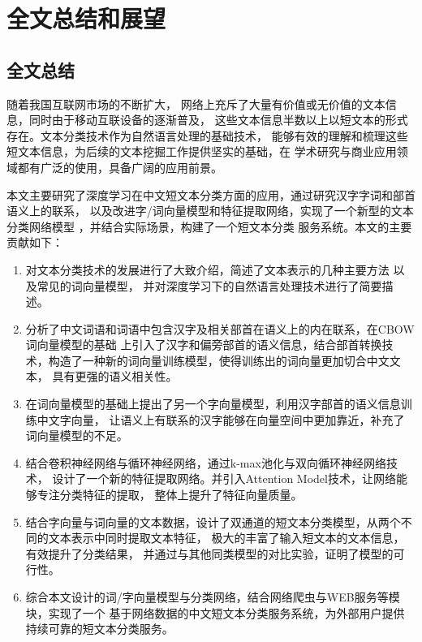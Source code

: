 \documentclass{standalone}
\begin{document}
\chapter{全文总结和展望}
\section{全文总结}
随着我国互联网市场的不断扩大，
网络上充斥了大量有价值或无价值的文本信息，同时由于移动互联设备的逐渐普及，
这些文本信息半数以上以短文本的形式存在。文本分类技术作为自然语言处理的基础技术，
能够有效的理解和梳理这些短文本信息，为后续的文本挖掘工作提供坚实的基础，在
学术研究与商业应用领域都有广泛的使用，具备广阔的应用前景。

本文主要研究了深度学习在中文短文本分类方面的应用，通过研究汉字字词和部首语义上的联系，
以及改进字/词向量模型和特征提取网络，实现了一个新型的文本分类网络模型
，并结合实际场景，构建了一个短文本分类
服务系统。本文的主要贡献如下：
\begin{enumerate}
    \item 对文本分类技术的发展进行了大致介绍，简述了文本表示的几种主要方法
    以及常见的词向量模型，
    并对深度学习下的自然语言处理技术进行了简要描述。
    \item 分析了中文词语和词语中包含汉字及相关部首在语义上的内在联系，在CBOW词向量模型的基础
    上引入了汉字和偏旁部首的语义信息，结合部首转换技术，构造了一种新的词向量训练模型，使得训练出的词向量更加切合中文文本，
    具有更强的语义相关性。
    \item 在词向量模型的基础上提出了另一个字向量模型，利用汉字部首的语义信息训练中文字向量，
    让语义上有联系的汉字能够在向量空间中更加靠近，补充了词向量模型的不足。
    \item 结合卷积神经网络与循环神经网络，通过k-max池化与双向循环神经网络技术，
    设计了一个新的特征提取网络。并引入Attention Model技术，让网络能够专注分类特征的提取，
    整体上提升了特征向量质量。
    \item 结合字向量与词向量的文本数据，设计了双通道的短文本分类模型，从两个不同的文本表示中同时提取文本特征，
    极大的丰富了输入短文本的文本信息，有效提升了分类结果，
    并通过与其他同类模型的对比实验，证明了模型的可行性。
    \item 综合本文设计的词/字向量模型与分类网络，结合网络爬虫与WEB服务等模块，实现了一个
    基于网络数据的中文短文本分类服务系统，为外部用户提供持续可靠的短文本分类服务。
\end{enumerate}
\end{document}

